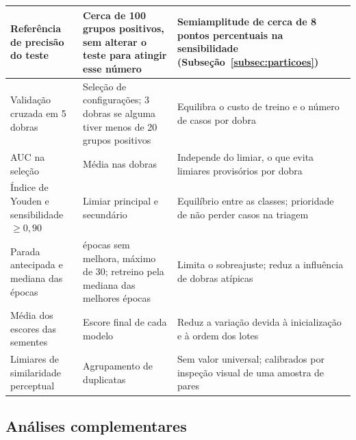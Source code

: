 \begin{longtable}{|>{\raggedright\arraybackslash}p{3.6cm}|>{\raggedright\arraybackslash}p{5.2cm}|>{\raggedright\arraybackslash}p{5.8cm}|}
	Referência de precisão do teste                & Cerca de 100 grupos positivos, sem alterar o teste para atingir esse número                                                  & Semiamplitude de cerca de 8 pontos percentuais na sensibilidade (Subseção~\ref{subsec:particoes})   \\ \hline
	Validação cruzada em 5 dobras                  & Seleção de configurações; 3 dobras se alguma tiver menos de 20 grupos positivos                                              & Equilibra o custo de treino e o número de casos por dobra                                           \\ \hline
	AUC na seleção                                 & Média nas dobras                                                                                                             & Independe do limiar, o que evita limiares provisórios por dobra                                     \\ \hline
	Índice de Youden e sensibilidade $\geq 0{,}90$ & Limiar principal e secundário                                                                                                & Equilíbrio entre as classes; prioridade de não perder casos na triagem \cite{unal2017}              \\ \hline
	Parada antecipada e mediana das épocas         & 5 épocas sem melhora, máximo de 30; retreino pela mediana das melhores épocas                                                & Limita o sobreajuste; reduz a influência de dobras atípicas                                         \\ \hline
	Média dos escores das sementes                 & Escore final de cada modelo                                                                                                  & Reduz a variação devida à inicialização e à ordem dos lotes                                         \\ \hline
	Limiares de similaridade perceptual            & Agrupamento de duplicatas                                                                                                    & Sem valor universal; calibrados por inspeção visual de uma amostra de pares                         \\ \hline
\end{longtable}
\endgroup
{}

\subsection{Análises complementares}
\label{subsec:analises-complementares}

